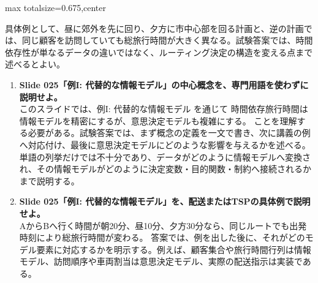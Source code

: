 \begin{adjustbox}{max totalsize={\textwidth}{0.675\textheight},center}
\begin{minipage}{\textwidth}
\begin{minipage}[t]{0.485\textwidth}
具体例として、昼に郊外を先に回り、夕方に市中心部を回る計画と、逆の計画では、同じ顧客を訪問していても総旅行時間が大きく異なる。試験答案では、時間依存性が単なるデータの違いではなく、ルーティング決定の構造を変える点まで述べるとよい。\par
{}
\begin{enumerate}
\item \textbf{Slide 025「例I: 代替的な情報モデル」の中心概念を、専門用語を使わずに説明せよ。}\\このスライドでは、例I: 代替的な情報モデル を通じて 時間依存旅行時間は情報モデルを精密にするが、意思決定モデルも複雑にする。 ことを理解する必要がある。試験答案では、まず概念の定義を一文で書き、次に講義の例へ対応付け、最後に意思決定モデルにどのような影響を与えるかを述べる。単語の列挙だけでは不十分であり、データがどのように情報モデルへ変換され、その情報モデルがどのように決定変数・目的関数・制約へ接続されるかまで説明する。
\item \textbf{Slide 025「例I: 代替的な情報モデル」を、配送またはTSPの具体例で説明せよ。}\\AからBへ行く時間が朝20分、昼10分、夕方30分なら、同じルートでも出発時刻により総旅行時間が変わる。 答案では、例を出した後に、それがどのモデル要素に対応するかを明示する。例えば、顧客集合や旅行時間行列は情報モデル、訪問順序や車両割当は意思決定モデル、実際の配送指示は実装である。
\end{enumerate}
\end{minipage}
\end{minipage}
\end{adjustbox}


